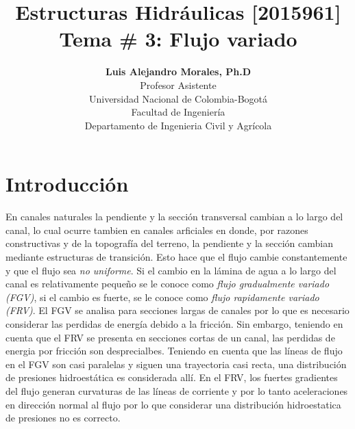 \documentclass[11pt, oneside]{article}
\title{Estructuras Hidr\'aulicas [2015961] \\ \textbf{Tema \# 3: Flujo variado}}
\author{\textbf{Luis Alejandro Morales, Ph.D}\\ \vspace{0.4cm} Profesor Asistente \\ Universidad Nacional de Colombia-Bogot\'a\\Facultad de Ingenier\'ia \\ Departamento de Ingenieria Civil y Agr\'icola}
\date{}
\begin{document}
\maketitle
\tableofcontents


\section{Introducci\'on} %
En canales naturales la pendiente y la secci\'on transversal cambian a lo largo del canal, lo cual ocurre tambien en canales arficiales en donde, por razones constructivas y de la topograf\'ia del terreno, la pendiente y la secci\'on cambian mediante estructuras de transici\'on.  Esto hace que el flujo cambie constantemente y que el flujo sea \emph{no uniforme}. Si el cambio  en la l\'amina de agua a lo largo del canal es relativamente  pequeño se le conoce como \emph{flujo gradualmente variado (FGV)}, si el cambio es fuerte, se le conoce como \emph{flujo rapidamente variado (FRV)}. El FGV se analisa para secciones largas de canales por lo que es necesario considerar las perdidas de energ\'ia debido a la fricci\'on. Sin embargo, teniendo en cuenta que el  FRV se presenta en secciones cortas de un canal, las perdidas de energia por fricci\'on son desprecialbes. Teniendo en cuenta que las l\'ineas de flujo en el FGV son casi paralelas y siguen una trayectoria casi recta, una distribuci\'on de presiones hidroest\'atica es considerada all\'i. En el FRV, los fuertes gradientes del flujo generan curvaturas de las l\'ineas de corriente y por lo tanto aceleraciones en direcci\'on normal al flujo por lo que considerar una distribuci\'on hidroestatica de presiones no es correcto. 
\end{document}
